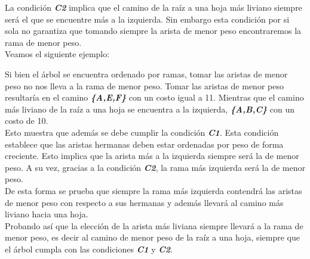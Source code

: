 \documentclass[10pt]{article}
\begin{document}
	La condici\'on \textbf{\textit{C2}} implica que el camino de la ra\'iz a una hoja m\'as liviano siempre ser\'a el que se encuentre m\'as a la izquierda. Sin embargo esta condici\'on por si sola no garantiza que tomando siempre la arista de menor peso encontraremos la rama de menor peso.\\
	Veamos el siguiente ejemplo:
	\begin{center}
	\end{center}
	Si bien el \'arbol se encuentra ordenado por ramas, tomar las aristas de menor peso no nos lleva a la rama de menor peso. Tomar las aristas de menor peso resultar\'ia en el camino \textbf{\textit{\{A,E,F\}}} con un costo igual a 11. Mientras que el camino m\'as liviano de la ra\'iz a una hoja se encuentra a la izquierda, \textbf{\textit{\{A,B,C\}}} con un costo de 10.\\
	Esto muestra que adem\'as se debe cumplir la condici\'on \textbf{\textit{C1}}.
	Esta condici\'on establece que las aristas hermanas deben estar ordenadas por peso de forma creciente. Esto implica que la arista m\'as a la izquierda siempre ser\'a la de menor peso. A su vez, gracias a la condici\'on \textbf{\textit{C2}}, la rama m\'as izquierda ser\'a la de menor peso. \\
	De esta forma se prueba que siempre la rama m\'as izquierda contendr\'a las aristas de menor peso con respecto a sus hermanas y adem\'as llevar\'a al camino m\'as liviano hacia una hoja. \\
	Probando as\'i que la elecci\'on de la arista m\'as liviana siempre llevar\'a a la rama de menor peso, es decir al camino de menor peso de la ra\'iz a una hoja, siempre que el \'arbol cumpla con las condiciones \textbf{\textit{C1}} y \textbf{\textit{C2}}.
\end{document}
